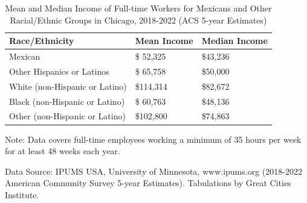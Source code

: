 \documentclass[
]{article}
\begin{document}
\begin{table}[H]
\centering
\begin{threeparttable}
\caption{\label{tab:unnamed-chunk-34}Mean and Median Income of Full-time Workers for Mexicans and Other Racial/Ethnic Groups in Chicago, 2018-2022 (ACS 5-year Estimates)}
\centering
\fontsize{8}{10}\selectfont
\begin{tabular}[t]{>{\raggedright\arraybackslash}p{14.2em}>{\raggedleft\arraybackslash}p{7.9em}>{\raggedleft\arraybackslash}p{7.9em}}
\toprule
\begingroup\fontsize{8}{10}\selectfont \textbf{Race/Ethnicity}\endgroup & \begingroup\fontsize{8}{10}\selectfont \textbf{Mean Income}\endgroup & \begingroup\fontsize{8}{10}\selectfont \textbf{Median Income}\endgroup\\
\midrule
Mexican & \$ 52,325 & \$43,236\\
Other Hispanics or Latinos & \$ 65,758 & \$50,000\\
White (non-Hispanic or Latino) & \$114,314 & \$82,672\\
Black (non-Hispanic or Latino) & \$ 60,763 & \$48,136\\
Other (non-Hispanic or Latino) & \$102,800 & \$74,863\\
\bottomrule
\end{tabular}
\begin{tablenotes}
\small
\item [] \footnotesize{Note: Data covers full-time employees working a minimum of 35 hours per week for at least 48 weeks each year.}
\item [] \footnotesize{Data Source: IPUMS USA, University of Minnesota, www.ipums.org (2018-2022 American Community Survey 5-year Estimates). Tabulations by Great Cities Institute.}
\end{tablenotes}
\end{threeparttable}
\end{table}
\end{document}
